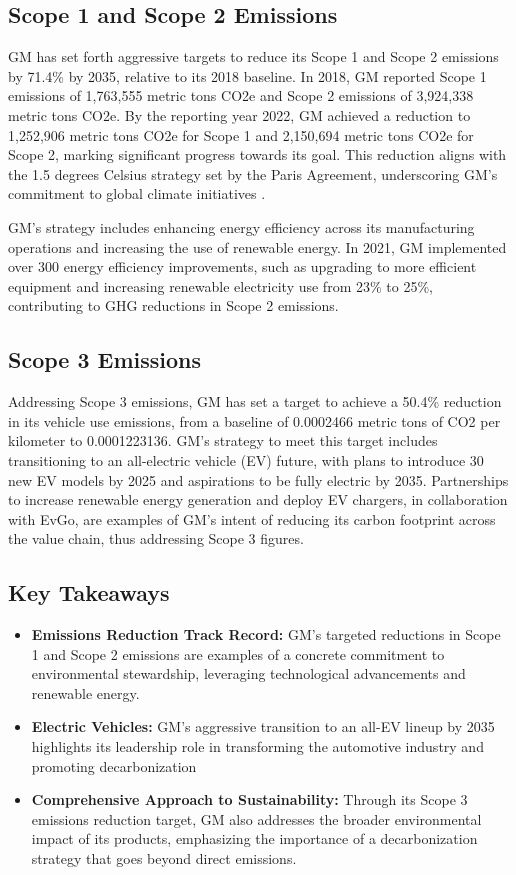 \subsection*{Scope 1 and Scope 2 Emissions}
GM has set forth aggressive targets to reduce its Scope 1 and Scope 2 emissions by 71.4\% by 2035, relative to its 2018 baseline. In 2018, GM reported Scope 1 emissions of 1,763,555 metric tons CO2e and Scope 2 emissions of 3,924,338 metric tons CO2e. By the reporting year 2022, GM achieved a reduction to 1,252,906 metric tons CO2e for Scope 1 and 2,150,694 metric tons CO2e for Scope 2, marking significant progress towards its goal. This reduction aligns with the 1.5 degrees Celsius strategy set by the Paris Agreement, underscoring GM's commitment to global climate initiatives \cite{GeneralMotorsWikipedia, Zhou2020Decarbonization}.

GM's strategy includes enhancing energy efficiency across its manufacturing operations and increasing the use of renewable energy. In 2021, GM implemented over 300 energy efficiency improvements, such as upgrading to more efficient equipment and increasing renewable electricity use from 23\% to 25\%, contributing to GHG reductions in Scope 2 emissions.

\subsection*{Scope 3 Emissions}
Addressing Scope 3 emissions, GM has set a target to achieve a 50.4\% reduction in its vehicle use emissions, from a baseline of 0.0002466 metric tons of CO2 per kilometer to 0.0001223136. GM's strategy to meet this target includes transitioning to an all-electric vehicle (EV) future, with plans to introduce 30 new EV models by 2025 and aspirations to be fully electric by 2035. Partnerships to increase renewable energy generation and deploy EV chargers, in collaboration with EvGo, are examples of GM's intent of reducing its carbon footprint across the value chain, thus addressing Scope 3 figures.
 
\subsection*{Key Takeaways}
\begin{itemize}
    \item \textbf{Emissions Reduction Track Record:} GM's targeted reductions in Scope 1 and Scope 2 emissions are examples of a concrete commitment to environmental stewardship, leveraging technological advancements and renewable energy.
    \item \textbf{Electric Vehicles:} GM's aggressive transition to an all-EV lineup by 2035 highlights its leadership role in transforming the automotive industry and promoting decarbonization
    \item \textbf{Comprehensive Approach to Sustainability:} Through its Scope 3 emissions reduction target, GM also addresses the broader environmental impact of its products, emphasizing the importance of a decarbonization strategy that goes beyond direct emissions.
\end{itemize}

